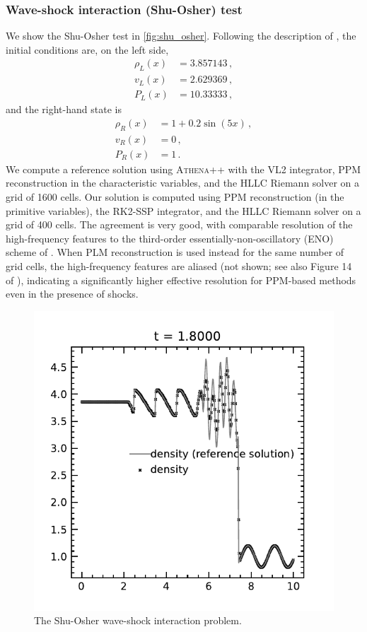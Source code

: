 \documentclass[fleqn,usenatbib]{mnras}
\begin{document}
\subsubsection{Wave-shock interaction (Shu-Osher) test}
We show the Shu-Osher test in \autoref{fig:shu_osher}. Following the description of \cite{Shu_1989}, the initial conditions are, on the left side,
\begin{align}
\rho_L(x) &= 3.857143 \, , \\
v_L(x) &= 2.629369 \, , \\
P_L(x) &= 10.33333 \, ,
\end{align}
and the right-hand state is
\begin{align}
\rho_R(x) &= 1 + 0.2 \sin(5x) \, , \\
v_R(x) &= 0 \, , \\
P_R(x) &= 1 \, .
\end{align}
We compute a reference solution using \textsc{Athena++} \citep{Stone_2020} with the VL2 integrator, PPM reconstruction in the characteristic variables, and the HLLC Riemann solver on a grid of 1600 cells. Our solution is computed using PPM reconstruction (in the primitive variables), the RK2-SSP integrator, and the HLLC Riemann solver on a grid of 400 cells. The agreement is very good, with comparable resolution of the high-frequency features to the third-order essentially-non-oscillatory (ENO) scheme of \cite{Shu_1989}. When PLM reconstruction is used instead for the same number of grid cells, the high-frequency features are aliased (not shown; see also Figure 14 of \citealt{Shu_1989}), indicating a significantly higher effective resolution for PPM-based methods even in the presence of shocks.
\begin{figure}
    \includegraphics[width=\columnwidth]{hydro_shuosher.pdf}
    \caption{The Shu-Osher wave-shock interaction problem.}
    \label{fig:shu_osher}
\end{figure}
\end{document}
